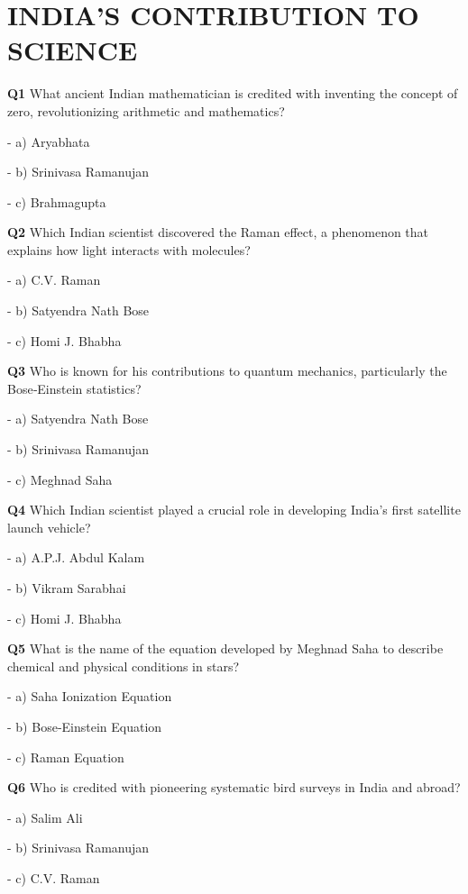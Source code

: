 \section{INDIA'S CONTRIBUTION TO SCIENCE}

\textbf{Q1} What ancient Indian mathematician is credited with inventing the concept of zero, revolutionizing arithmetic and mathematics?\par
\quad - a) Aryabhata\par
\quad - b) Srinivasa Ramanujan\par
\quad - c) Brahmagupta\par

\textbf{Q2} Which Indian scientist discovered the Raman effect, a phenomenon that explains how light interacts with molecules?\par
\quad - a) C.V. Raman\par
\quad - b) Satyendra Nath Bose\par
\quad - c) Homi J. Bhabha\par

\textbf{Q3} Who is known for his contributions to quantum mechanics, particularly the Bose‑Einstein statistics?\par
\quad - a) Satyendra Nath Bose\par
\quad - b) Srinivasa Ramanujan\par
\quad - c) Meghnad Saha\par

\textbf{Q4} Which Indian scientist played a crucial role in developing India's first satellite launch vehicle?\par
\quad - a) A.P.J. Abdul Kalam\par
\quad - b) Vikram Sarabhai\par
\quad - c) Homi J. Bhabha\par

\textbf{Q5} What is the name of the equation developed by Meghnad Saha to describe chemical and physical conditions in stars?\par
\quad - a) Saha Ionization Equation\par
\quad - b) Bose‑Einstein Equation\par
\quad - c) Raman Equation\par

\textbf{Q6} Who is credited with pioneering systematic bird surveys in India and abroad?\par
\quad - a) Salim Ali\par
\quad - b) Srinivasa Ramanujan\par
\quad - c) C.V. Raman\par

